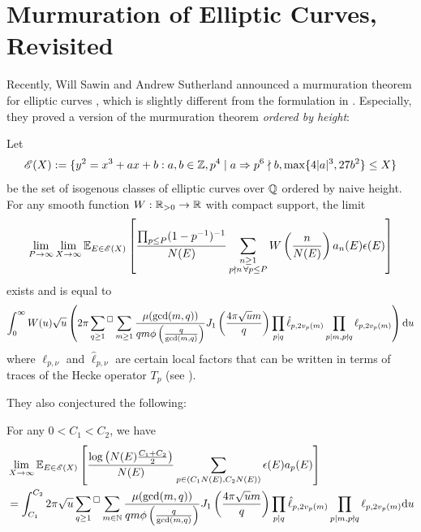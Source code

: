 \section{Murmuration of Elliptic Curves, Revisited}
\label{sec:elliptic2}

Recently, Will Sawin and Andrew Sutherland announced a murmuration theorem for elliptic curves \cite{sawin2025murmurations}, which is slightly different from the formulation in \cite{he2024murmurations}.
Especially, they proved a version of the murmuration theorem \emph{ordered by height}:


\begin{theorem}
    \label{thm:sawin-sutherland}
    Let 
    \[
    \mathscr{E}(X) := \{y^2 = x^3 + ax + b: a, b \in \mathbb{Z}, p^4 \mid a \Rightarrow p^6 \nmid b, \max\{4|a|^3, 27 b^2\} \le X\}
    \]
    be the set of isogenous classes of elliptic curves over $\mathbb{Q}$ ordered by naive height.
    For any smooth function $W : \mathbb{R}_{>0} \to \mathbb{R}$ with compact support, the limit
    \begin{equation}
        \lim_{P \to \infty }\lim_{X \to \infty} \mathbb{E}_{E \in \mathscr{E}(X)} \left[ \frac{\prod_{p \le P}(1 - p^{-1})^{-1}}{N(E)} \sum_{\substack{n \ge 1 \\ p \nmid n \,\forall p \le P}} W\left(\frac{n}{N(E)}\right) a_n(E) \epsilon(E)\right]
    \end{equation}
    exists and is equal to
    \begin{equation}
        \int_{0}^{\infty} W(u) \sqrt{u} \left(2\pi \sideset{}{{}^\square}\sum_{q \ge 1} \sum_{m \ge 1} \frac{\mu(\gcd(m,q))}{qm \phi\left(\frac{q}{\gcd(m,q)}\right)} J_1 \left(\frac{4 \pi \sqrt{u}m}{q}\right) \prod_{p \mid q} \hat{\ell}_{p, 2v_p(m)} \prod_{p \mid m, p \nmid q} \ell_{p, 2v_p(m)} \right) \mathrm{d} u
    \end{equation}
    where $\ell_{p, \nu}$ and $\hat{\ell}_{p, \nu}$ are certain local factors that can be written in terms of traces of the Hecke operator $T_p$ (see \cite[Lemma 3, 4]{sawin2025murmurations}).
\end{theorem}

They also conjectured the following:
\begin{conjecture}
\label{conj:sawin_sutherland}
    For any $0 < C_1 < C_2$, we have
    \begin{align*}
        &\lim_{X \to \infty} \mathbb{E}_{E \in \mathscr{E}(X)} \left[\frac{\log\left(N(E) \frac{C_1 + C_2}{2}\right)}{N(E)} \sum_{p \in (C_1 N(E), C_2 N(E))} \epsilon(E) a_p(E)\right] \\
        &= \int_{C_1}^{C_2} 2 \pi \sqrt{u} \sideset{}{{}^\square}\sum_{q \ge 1} \sum_{m \in \mathbb{N}} \frac{\mu(\gcd(m, q))}{qm \phi\left(\frac{q}{\gcd(m, q)}\right)} J_1 \left(\frac{4 \pi \sqrt{u}m}{q}\right) \prod_{p \mid q} \hat{\ell}_{p, 2v_p(m)} \prod_{p \mid m, p \nmid q} \ell_{p, 2v_p(m)} \mathrm{d} u
    \end{align*}
\end{conjecture}

